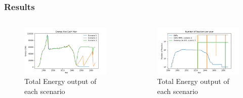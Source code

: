 \begin{frame}
\frametitle{Results}
    \begin{columns}
        \column[t]{5cm}
        \begin{figure}[t!]
            \includegraphics[scale=0.26, trim=0 5 0 10,clip]{figures/energy_all.png}
            \caption{Total Energy output of each scenario}
            \label{fig:energy}
        \end{figure}
        \begin{figure}[h]
            \includegraphics[scale=0.26, trim=0 5 0 10,clip]{figures/rx_deployment_all.png}
            \caption{Total Energy output of each scenario}
            \label{fig:ex_deployment}
        \end{figure}


\end{columns}
\end{frame}
